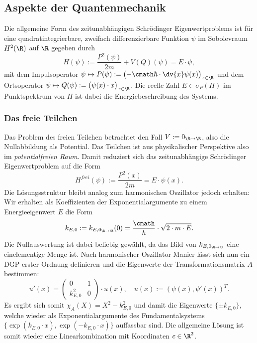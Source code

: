 \documentclass[../main.tex]{subfiles}
\begin{document}
    \subsection{Aspekte der Quantenmechanik}
        Die allgemeine Form des zeitunabhängigen Schrödinger Eigenwertproblems ist für eine quadratintegrierbare, zweifach differenzierbare Funktion $\psi$ im Sobolevraum $H^2(\R)$ auf $\R$ gegeben durch
        \[
            H(\psi) := \frac{P^2(\psi)}{2m} + V(Q)(\psi) = E\cdot\psi,
        \]
        mit dem Impulsoperator $\psi\mapsto P(\psi):=\bigl(-\cmath\hbar\cdot\dv{x}\psi(x)\bigr)_{x\in\R}$ und dem Ortsoperator $\psi\mapsto Q(\psi):=\bigl(\psi(x)\cdot x\bigr)_{x\in\R}$. Die reelle Zahl $E\in\sigma_P(H)$ im Punktspektrum von $H$ ist dabei die Energiebeschreibung des Systems.
        \subsubsection{Das freie Teilchen}
            Das Problem des freien Teilchen betrachtet den Fall $V:=0_{\R\to\R}$, also die Nullabbildung als Potential. Das Teilchen ist aus physikalischer Perspektive also im \emph{potentialfreien Raum}. Damit reduziert sich das zeitunabhängige Schrödinger Eigenwertproblem auf die Form 
            \[
                H^\textit{frei}(\psi):= \frac{P^2(x)}{2m} = E\cdot\psi(x).
            \]
            Die Lösungsstruktur bleibt analog zum harmonischen Oszillator jedoch erhalten: Wir erhalten als Koeffizienten der Exponentialargumente zu einem Energieeigenwert $E$ die Form 
            \[
                k_{E,0} := k_{E,0_{\R\to\R}}(0) = \frac{\cmath}{\hbar}\cdot\sqrt{2\cdot m\cdot E}. 
            \]
            Die Nullauswertung ist dabei beliebig gewählt, da das Bild von $k_{E,0_{\R\to\R}}$ eine einelementige Menge ist. Nach harmonischer Oszillator Manier lässt sich nun ein DGP erster Ordnung definieren und die Eigenwerte der Transformationsmatrix $A$ bestimmen:
            \[
                u'(x) = \begin{pmatrix}
                    0 & 1\\
                    k_{E,0}^2 & 0
                \end{pmatrix}\cdot u(x),\quad u(x):=(\psi(x), \psi'(x))^T.
            \]
            Es ergibt sich somit $\chi_A(X) = X^2 - k_{E,0}^2$ und damit die Eigenwerte $\{\pm k_{E,0}\}$, welche wieder als Exponentialargumente des Fundamentalsystems $\{\exp(k_{E,0}\cdot x), \exp(-k_{E,0}\cdot x)\}$ auffassbar sind. Die allgemeine Lösung ist somit wieder eine Linearkombination mit Koordinaten $c\in\R^2$. 
            
\end{document}
